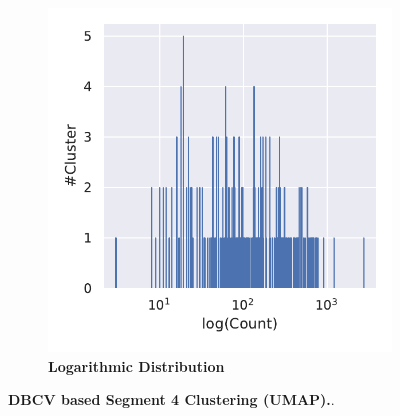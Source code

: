 \begin{figure}[!hbt]
\begin{subfigure}[b]{0.475\textwidth}
    \end{subfigure}
    \hfill
    \begin{subfigure}[b]{0.475\textwidth}
        \caption[Logarithmic Distribution]{\textbf{Logarithmic Distribution}}
        \label{subfig:UMAP_Cluster_DBCV_Distribution_log_4}            \includegraphics[width=\textwidth]{UMAP/Cluster_Distribution_Log_Segment_4_alternative.pdf}
    \end{subfigure}
    \caption[\Acrshort{DBCV} based Segment 4 Clustering (\Acrshort{UMAP})]{\textbf{\Acrshort{DBCV} based Segment 4 Clustering (\Acrshort{UMAP}).}.}
    \label{fig:UMAP_Cluster_DBCV_4}
\end{figure}

